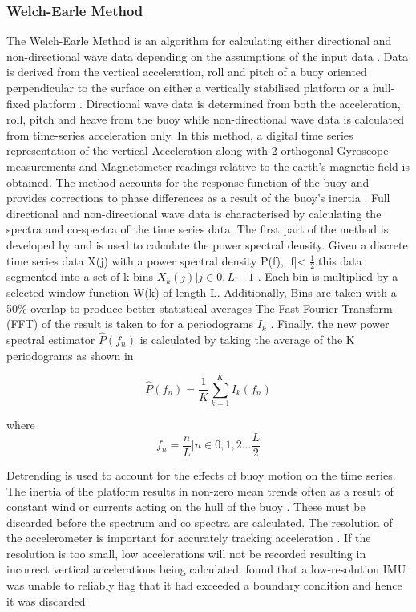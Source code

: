 \subsubsection{Welch-Earle Method}
\label{welchearl}
The Welch-Earle Method is an algorithm for calculating either directional and non-directional wave data depending on the assumptions of the input data \cite{earle1996nondirectional}. Data is derived from the vertical acceleration, roll and pitch of a buoy oriented perpendicular to the surface on either a vertically stabilised platform or a hull-fixed platform \cite{earle1996nondirectional}. Directional wave data is determined from both the acceleration, roll, pitch and heave from the buoy while non-directional wave data is calculated from time-series acceleration only. In this method, a digital time series representation of the vertical Acceleration along with 2 orthogonal Gyroscope measurements and Magnetometer readings relative to the earth’s magnetic field is obtained. The method accounts for the response function of the buoy and provides corrections to phase differences as a result of the buoy's inertia \cite{earle1996nondirectional}. Full directional and non-directional wave data is characterised by calculating the spectra and co-spectra of the time series data. The first part of the method is developed by \textcite{welch1967use} and is used to calculate the power spectral density.
Given a discrete time series data X(j) with a power spectral density P(f), |f|< $\frac{1}{2}$.this data segmented into a set of k-bins $X_k(j) | j \in {0,L-1}$ \cite{welch1967use}. Each bin is multiplied by a selected window function W(k) of length L. Additionally, Bins are taken with a 50\% overlap to produce better statistical averages \cite{earle1996nondirectional} The Fast Fourier Transform (FFT) of the result is taken to for a periodograms $I_k$ \cite{earle1996nondirectional}. Finally, the new power spectral estimator $\hat{P}(f_n)$ is calculated by taking the average of the K periodograms as shown in \textcite{welch1967use}

\begin{equation}
	\hat{P}(f_n) = \frac{1}{K}\sum^K_{k=1}I_k(f_n)
\end{equation}

where 
\begin{equation}
	f_n = \frac{n}{L} | n \in 0,1,2... \frac{L}{2}
\end{equation}

Detrending is used to account for the effects of buoy motion on the time series. The inertia of the platform results in non-zero mean trends often as a result of constant wind or currents acting on the hull of the buoy \cite{earle1996nondirectional}. These must be discarded before the spectrum and co spectra are calculated. The resolution of the accelerometer is important for accurately tracking acceleration \cite{kohout2015device}. If the resolution is too small, low accelerations will not be recorded resulting in incorrect vertical accelerations being calculated. \textcite{kohout2015device} found that a low-resolution IMU was unable to reliably flag that it had exceeded a boundary condition and hence it was discarded \cite{kohout2015device}\par 

